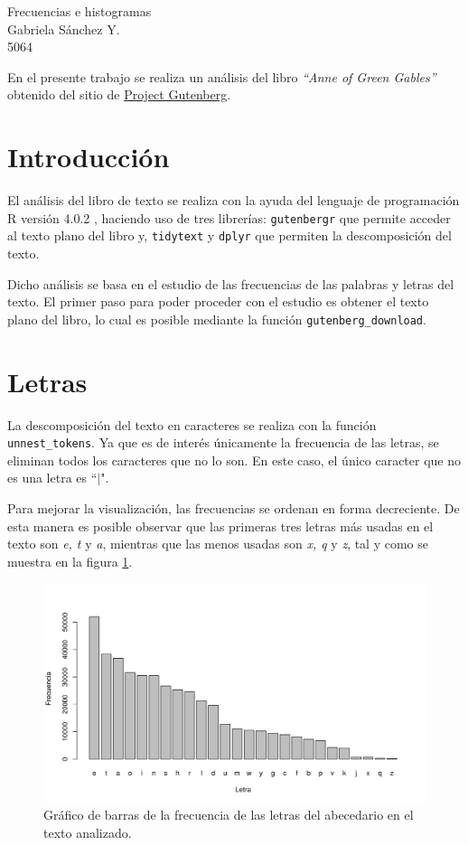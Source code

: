 \documentclass[12pt]{article}
\begin{document}
	\thispagestyle{empty}

	\begin{center}
		{\Large Frecuencias e histogramas}\\
		Gabriela S\'anchez Y.\\
		5064
	\end{center}

	En el presente trabajo se realiza un análisis del libro \textit{``Anne of Green Gables''} obtenido del sitio de \href{http://www.gutenberg.org/}{Project Gutenberg}. 

	\section{Introducción}
	
	El análisis del libro de texto se realiza con la ayuda del lenguaje de programación \textsc{R} versión 4.0.2 \cite{r}, haciendo uso de tres librerías: \texttt{gutenbergr} que permite acceder al texto plano del libro y, \texttt{tidytext} y \texttt{dplyr} que permiten la descomposición del texto.

	Dicho análisis se basa en el estudio de las frecuencias de las palabras y letras del texto. El primer paso para poder proceder con el estudio es obtener el texto plano del libro, lo cual es posible mediante la función \texttt{gutenberg\_download}.  

	\section{Letras}
	
	La descomposición del texto en caracteres se realiza con la función \texttt{unnest\_tokens}. Ya que es de interés únicamente la frecuencia de las letras, se eliminan todos los caracteres que no lo son. En este caso, el único caracter que no es una letra es ``$\mid$". 
	
	Para mejorar la visualización, las frecuencias se ordenan en forma decreciente. De esta manera es posible observar que las primeras tres letras más usadas en el texto son \textit{e, t} y \textit{a}, mientras que las menos usadas son \textit{x, q} y \textit{z}, tal y como se muestra en la figura \ref{letras}.
	
	
	\begin{figure}
		\centering
		\includegraphics[scale=0.7]{letras_decreciente.png}
		\caption{Gráfico de barras de la frecuencia de las letras del abecedario en el texto analizado.}
		\label{letras}
	\end{figure}
\end{document}
